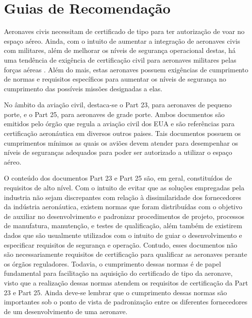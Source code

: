 \section{Guias de Recomendação}

Aeronaves civis necessitam de certificado de tipo para ter autorização de voar no espaço aéreo. Ainda, com o intuito de aumentar a integração de aeronaves civis com militares, além de melhorar os níveis de segurança operacional destas, há uma tendência de exigência de certificação civil para aeronaves militares pelas forças aéreas . Além do mais, estas aeronaves possuem exigências de cumprimento de normas e requisitos específicos para aumentar os níveis de segurança no cumprimento das possíveis missões designadas a elas.

No âmbito da aviação civil, destaca-se o Part 23, para aeronaves de pequeno porte, e o Part 25, para aeronaves de grade porte. Ambos documentos são emitidos pelo órgão que regula a aviação civil dos EUA e são referências para certificação aeronáutica em diversos outros paises. Tais documentos possuem os cumprimentos mínimos as quais os aviões devem atender para  desempenhar os níveis de seguranças adequados para poder ser autorizado a utilizar o espaço aéreo.

O conteúdo dos documentos Part 23 e Part 25 são, em geral, constituídos de requisitos de alto nível. Com o intuito de evitar que as soluções empregadas pela industria não sejam discrepantes com relação à dissimilaridade dos fornecedores da indústria aeronáutica, existem normas que foram distribuídas com o objetivo de auxiliar no desenvolvimento e padronizar procedimentos de projeto, processos de manufatura, manutenção, e testes de qualificação, além também de existirem dados que são usualmente utilizados com o intuito de guiar o desenvolvimento e especificar requisitos de segurança e operação. Contudo, esses documentos não são necessariamente requisitos de certificação para qualificar as aeronaves perante os órgãos reguladores. Todavia, o cumprimento dessas normas é de papel fundamental para facilitação na aquisição do certificado de tipo da aeronave, visto que a realização dessas normas atendem os requisitos de certificação da Part 23 e Part 25. Ainda deve-se lembrar que o cumprimento dessas normas são importantes sob o ponto de vista de padronização entre os diferentes fornecedores de um desenvolvimento de uma aeronave.

